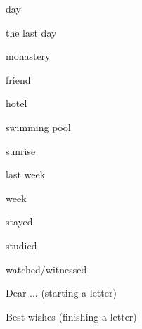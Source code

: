 \begin{flashcard}{\LARGE day}
\LARGE {}
\end{flashcard}
\begin{flashcard}{\LARGE the last day}
\LARGE {}
\end{flashcard}
\begin{flashcard}{\LARGE monastery}
\LARGE {}
\end{flashcard}
\begin{flashcard}{\LARGE friend}
\LARGE {}
\end{flashcard}
\begin{flashcard}{\LARGE hotel}
\LARGE {}
\end{flashcard}
\begin{flashcard}{\LARGE swimming pool}
\LARGE {}
\end{flashcard}
\begin{flashcard}{\LARGE sunrise}
\LARGE {}
\end{flashcard}
\begin{flashcard}{\LARGE last week}
\LARGE {}
\end{flashcard}
\begin{flashcard}{\LARGE week}
\LARGE {}
\end{flashcard}
\begin{flashcard}{\LARGE stayed}
\LARGE {}
\end{flashcard}
\begin{flashcard}{\LARGE studied}
\LARGE {}
\end{flashcard}
\begin{flashcard}{\LARGE watched/witnessed}
\LARGE {}
\end{flashcard}
\begin{flashcard}{\LARGE Dear ... (starting a letter)}
\LARGE {}
\end{flashcard}
\begin{flashcard}{\LARGE Best wishes (finishing a letter)}
\LARGE {}
\end{flashcard}

